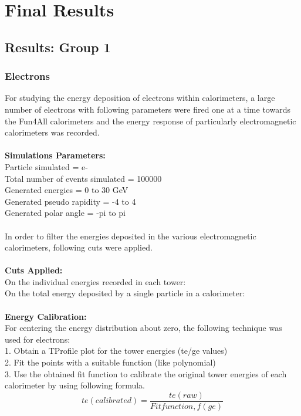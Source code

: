 \chapter{Final Results}

\section{Results: Group 1}

\subsection{Electrons}
For studying the energy deposition of electrons within calorimeters, a large number of electrons with following parameters were fired one at a time towards the Fun4All 
calorimeters and the energy response of particularly electromagnetic calorimeters was recorded. \\
\\
\textbf{Simulations Parameters:}\\
Particle simulated = e-\\
Total number of events simulated = 100000\\
Generated energies = 0 to 30 GeV \\
Generated pseudo rapidity = -4 to 4\\
Generated polar angle = -pi to pi\\
\\
In order to filter the energies deposited in the various electromagnetic calorimeters, following cuts were applied.\\
\\
\textbf{Cuts Applied:}\\
On the individual energies recorded in each tower: \\
On the total energy deposited by a single particle in a calorimeter: \\
\\
\textbf{Energy Calibration:}\\
For centering the energy distribution about zero, the following technique was used for electrons:\\
1. Obtain a TProfile plot for the tower energies (te/ge values)\\
2. Fit the points with a suitable function (like polynomial)\\
3. Use the obtained fit function to calibrate the original tower energies of each calorimeter by using following formula.\\
$$ te(calibrated) = \frac{te(raw)}{Fit function, f(ge)} $$
